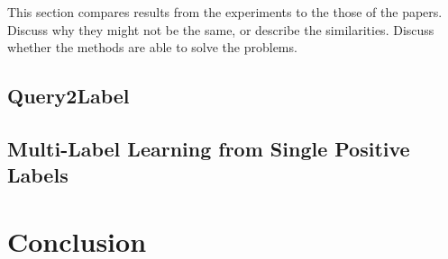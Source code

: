 \documentclass[lettersize,journal]{IEEEtran}
\begin{document}
This section compares results from the experiments to the those of the papers. Discuss why they might not be the same, or describe the similarities. Discuss whether the methods are able to solve the problems.




\subsection{Query2Label}

\subsection{Multi-Label Learning from Single Positive Labels}


\section{Conclusion}






\end{document}
